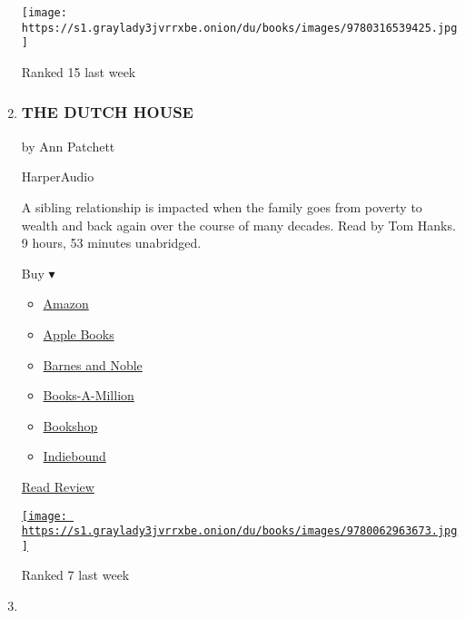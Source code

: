 \begin{enumerate}
  \texttt{[image: https://s1.graylady3jvrrxbe.onion/du/books/images/9780316539425.jpg]}

  Ranked 15 last week
\item
  \href{https://www.nytimes3xbfgragh.onion/2019/09/21/books/review-dutch-house-ann-patchett.html}{}

  \hypertarget{the-dutch-house}{%
  \subsubsection{THE DUTCH HOUSE}\label{the-dutch-house}}

  by Ann Patchett

  HarperAudio

  A sibling relationship is impacted when the family goes from poverty
  to wealth and back again over the course of many decades. Read by Tom
  Hanks. 9 hours, 53 minutes unabridged.

  Buy ▾

  \begin{itemize}
  \tightlist
  \item
    \href{https://www.amazon.com/Dutch-House-Novel-Ann-Patchett/dp/0062963678?tag=NYTBS-20}{Amazon}
  \item
    \href{https://du-gae-books-dot-nyt-du-prd.appspot.com/buy?title=THE+DUTCH+HOUSE\&author=Ann+Patchett}{Apple
    Books}
  \item
    \href{https://www.anrdoezrs.net/click-7990613-11819508?url=https\%3A\%2F\%2Fwww.barnesandnoble.com\%2Fw\%2F\%3Fean\%3D9780062963703}{Barnes
    and Noble}
  \item
    \href{https://www.anrdoezrs.net/click-7990613-35140?url=https\%3A\%2F\%2Fwww.booksamillion.com\%2Fp\%2FTHE\%2BDUTCH\%2BHOUSE\%2FAnn\%2BPatchett\%2F9780062963703}{Books-A-Million}
  \item
    \href{https://bookshop.org/a/3546/9780062963703}{Bookshop}
  \item
    \href{https://www.indiebound.org/book/9780062963703?aff=NYT}{Indiebound}
  \end{itemize}

  \href{https://www.nytimes3xbfgragh.onion/2019/09/21/books/review-dutch-house-ann-patchett.html}{Read
  Review}

  \href{https://www.nytimes3xbfgragh.onion/2019/09/21/books/review-dutch-house-ann-patchett.html}{\texttt{[image: https://s1.graylady3jvrrxbe.onion/du/books/images/9780062963673.jpg]}}

  Ranked 7 last week
\item
  \hypertarget{the-silent-patient}{%
}
\end{enumerate}
